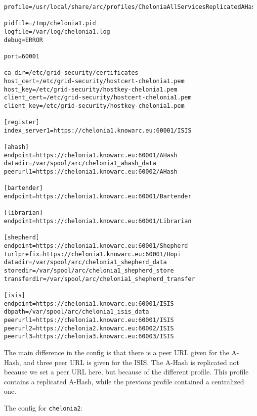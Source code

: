 \documentclass{article}
\begin{document}
\begin{verbatim}
profile=/usr/local/share/arc/profiles/CheloniaAllServicesReplicatedAHashWithISIS.xml

pidfile=/tmp/chelonia1.pid
logfile=/var/log/chelonia1.log
debug=ERROR

port=60001

ca_dir=/etc/grid-security/certificates
host_cert=/etc/grid-security/hostcert-chelonia1.pem
host_key=/etc/grid-security/hostkey-chelonia1.pem
client_cert=/etc/grid-security/hostcert-chelonia1.pem
client_key=/etc/grid-security/hostkey-chelonia1.pem

[register]
index_server1=https://chelonia1.knowarc.eu:60001/ISIS

[ahash]
endpoint=https://chelonia1.knowarc.eu:60001/AHash
datadir=/var/spool/arc/chelonia1_ahash_data
peerurl1=https://chelonia1.knowarc.eu:60002/AHash

[bartender]
endpoint=https://chelonia1.knowarc.eu:60001/Bartender

[librarian]
endpoint=https://chelonia1.knowarc.eu:60001/Librarian

[shepherd]
endpoint=https://chelonia1.knowarc.eu:60001/Shepherd
turlprefix=https://chelonia1.knowarc.eu:60001/Hopi
datadir=/var/spool/arc/chelonia1_shepherd_data
storedir=/var/spool/arc/chelonia1_shepherd_store
transferdir=/var/spool/arc/chelonia1_shepherd_transfer

[isis]
endpoint=https://chelonia1.knowarc.eu:60001/ISIS
dbpath=/var/spool/arc/chelonia1_isis_data
peerurl1=https://chelonia1.knowarc.eu:60001/ISIS
peerurl2=https://chelonia2.knowarc.eu:60002/ISIS
peerurl3=https://chelonia3.knowarc.eu:60003/ISIS
\end{verbatim}

The main difference in the config is that there is a peer URL given for the A-Hash, and three peer URL is given for the ISIS. The A-Hash is replicated not because we set a peer URL here, but because of the different profile. This profile contains a replicated A-Hash, while the previous profile contained a centralized one.

The config for \verb!chelonia2!:
\end{document}
